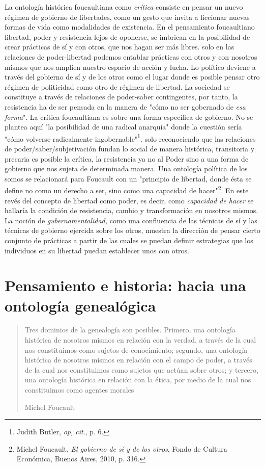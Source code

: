 \documentclass{book}
\begin{document}
La ontología histórica foucaultiana como \emph{crítica} consiste en
pensar un nuevo régimen de gobierno de libertades, como un gesto que
invita a ficcionar nuevas formas de vida como modalidades de existencia.
En el pensamiento foucaultiano libertad, poder y resistencia lejos de
oponerse, se imbrican en la posibilidad de crear prácticas de sí y con
otros, que nos hagan ser más libres. solo en las relaciones de
poder-libertad podemos entablar prácticas con otros y con nosotros
mismos que nos amplíen nuestro espacio de acción y lucha. Lo político
deviene a través del gobierno de sí y de los otros como el lugar donde
es posible pensar otro régimen de politicidad como otro de régimen de
libertad. La sociedad se constituye a través de relaciones de
poder-saber contingentes, por tanto, la resistencia ha de ser pensada en
la manera de "cómo no ser gobernado de \emph{esa forma}". La crítica
foucaultiana es sobre una forma específica de gobierno. No se plantea
aquí "la posibilidad de una radical anarquía" donde la cuestión sería
"cómo volverse radicalmente ingobernable"\footnote{Judith Butler,
  \emph{op, cit}., p. 6.}. solo reconociendo que las relaciones de
poder/saber/subjetivación fundan lo social de manera histórica,
transitoria y precaria es posible la crítica, la resistencia ya no al
Poder sino a una forma de gobierno que nos sujeta de determinada manera.
Una ontología política de los somos se relacionará para Foucault con un
"principio de libertad, donde ésta se define no como un derecho a ser,
sino como una capacidad de hacer"\footnote{Michel Foucault, \emph{El
  gobierno de sí y de los otros}, Fondo de Cultura Económica, Buenos
  Aires, 2010, p. 316.}. En este revés del concepto de libertad como
poder, es decir, como \emph{capacidad de hacer} se hallaría la condición
de resistencia, cambio y transformación en nosotros mismos. La noción de
\emph{gubernamentalidad,} como una confluencia de las técnicas de sí y
las técnicas de gobierno ejercida sobre los otros, muestra la dirección
de pensar cierto conjunto de prácticas a partir de las cuales se puedan
definir estrategias que los individuos en su libertad puedan establecer
unos con otros.

\section{Pensamiento e historia: hacia una ontología genealógica}

\begin{quote}
Tres dominios de la genealogía son posibles. Primero, una ontología
histórica de nosotros mismos en relación con la verdad, a través de la
cual nos constituimos como sujetos de conocimiento; segundo, una
ontología histórica de nosotros mismos en relación con el campo de
poder, a través de la cual nos constituimos como sujetos que actúan
sobre otros; y tercero, una ontología histórica en relación con la
ética, por medio de la cual nos constituimos como agentes morales

Michel Foucault
\end{quote}
\end{document}
